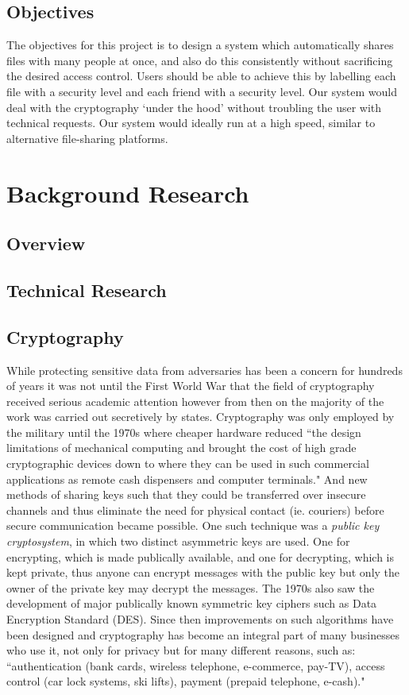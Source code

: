 \documentclass[12pt, titlepage]{article}
\begin{document}
\subsection{Objectives}
The objectives for this project is to design a system which automatically shares files with many people at once, and also do this consistently without sacrificing the desired access control. Users should be able to achieve this by labelling each file with a security level and each friend with a security level. Our system would deal with the cryptography `under the hood' without troubling the user with technical requests. Our system would ideally run at a high speed, similar to alternative file-sharing platforms.

\section{Background Research}
\subsection{Overview}

\subsection{Technical Research}
\subsection*{Cryptography}
While protecting sensitive data from adversaries has been a concern for hundreds of years it was not until the First World War that the field of cryptography received serious academic attention however from then on the majority of the work was carried out secretively by states.\cite{appliedCryptoBook} Cryptography was only employed by the military until the 1970s where cheaper hardware reduced ``the design limitations of mechanical computing and brought the cost of high grade cryptographic devices down to where they can be used in such commercial applications as remote cash dispensers and computer terminals."\cite{newCryptoDirections} And new methods of sharing keys such that they could be transferred over insecure channels and thus eliminate the need for physical contact (ie. couriers) before secure communication became possible. One such technique was a \textit{public key cryptosystem}, in which two distinct asymmetric keys are used. One for encrypting, which is made publically available, and one for decrypting, which is kept private, thus anyone can encrypt messages with the public key but only the owner of the private key may decrypt the messages. The 1970s also saw the development of major publically known symmetric key ciphers such as Data Encryption Standard (DES). Since then improvements on such algorithms have been designed and cryptography has become an integral part of many businesses who use it, not only for privacy but for many different reasons, such as: ``authentication (bank cards, wireless telephone, e-commerce, pay-TV), access control (car lock systems, ski lifts), payment (prepaid telephone, e-cash)."\cite{classicalCryptoBook}
\end{document}
